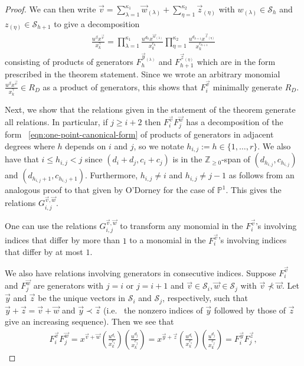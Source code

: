 \documentclass{amsart}
\theoremstyle{plain}
\theoremstyle{definition}
\theoremstyle{remark}
\numberwithin{equation}{section}
\newcommand\bp{{\mathbb P}}
\newcommand\bz{{\mathbb Z}}
\newcommand\mss{\mathscr{S}}
\begin{document}
\begin{proof}
\noindent
We can then write $\vec{v}  = \sum_{\lambda=1}^{\kappa_1}\vec{w}_{(\lambda)} +
\sum_{\eta=1}^{\kappa_2} \vec z_{(\eta)}$ with $w_{(\lambda)} \in \mss_h$ and
$z_{(\eta)} \in \mss_{h+1}$ to give a decomposition
\begin{align}
\label{eqn:one-point-canonical-form}
	\frac{u^{\beta} x^{\vec{v}}} {x_k^{\gamma}}	= \prod_{\lambda = 1}
	^{\kappa_1} \frac{u^{d_h} x^{\vec{w}_{(\lambda)}}} {x_k^{c_h}}
	\prod_{\eta = 1}^{\kappa_2} \frac{u^{d_{h + 1}} x^{\vec{z}_{(\eta)}}}
	{x_k^{c_{h + 1}}}
\end{align}
\noindent
consisting of products of generators $F_h^{\vec{y}_{(\lambda)}}$
and $F_{h + 1}^{\vec{z}_{(\eta)}}$ which are in the form
prescribed in the theorem statement. Since we wrote an arbitrary monomial
$\frac{u^{\beta} x^{\vec{v}}}{x_k^\gamma} \in R_D$ as a product of generators,
this shows that $F_i^{\vec v}$ minimally generate $R_D$.

Next, we show that the relations given in the statement of the theorem generate all relations. 
In particular, if $j \geq i + 2$ then $F_i^{\vec{v}} F_j^{\vec{w}}$
has a decomposition of the form ~\eqref{eqn:one-point-canonical-form} of 
products of generators in adjacent degrees where $h$
depends on $i$ and $ j$, so we notate $h_{i, j} := h \in \{1, \ldots, r\}$. We 
also have that $i \leq h_{i, j} < j$ since $(d_i + d_j, c_i + c_j)$ is in the
$\bz_{\geq 0}$-span of $(d_{h_{i, j}}, c_{h_{i, j}})$ and
$(d_{h_{i, j} + 1}, c_{h_{i, j} + 1})$. Furthermore,
$h_{i, j} \neq i$ and $h_{i, j} \neq j - 1$
as follows from an analogous proof to that given by O'Dorney
\cite[Theorem 6]{dorney:canonical} for the case of
$\bp^1$. This gives the relations
$G_{i, j}^{\vec{v}, \vec{w}}$.

One can use the relations $G_{i, j}^{\vec{v}, \vec{w}}$
to transform any monomial in the $F_i^{\vec{v}}$'s involving
indices that differ by more than $1$ to a monomial in the $F_i
^{\vec{v}}$'s involving indices that differ by at most $1$.

We also have relations involving generators in consecutive
indices. Suppose $F_i^{\vec{v}}$ and $F_j^{\vec{w}}$ are
generators with $j = i$ or $j = i + 1$ and $\vec{v} \in
\mss_i, \vec{w} \in \mss_j$ with $\vec{v} \not\prec \vec{w}$.
Let $\vec{y}$ and $\vec{z}$ be the unique vectors in $\mss_i$ and
$\mss_j$, respectively, such that $\vec{y} + \vec{z} = \vec{v} +
\vec{w}$ and $\vec{y} \prec \vec{z}$ (i.e.~ the nonzero indices
of $\vec{y}$ followed by those of $\vec{z}$ give an increasing
sequence). Then we see that
\begin{align*}
	F_i^{\vec{v}} F_j^{\vec{w}} = x^{\vec{v} + \vec{w}}
	\left(\frac{u^{d_i}}{x_k^{c_i}}\right)
	\left(\frac{u^{d_j}}{x_k^{c_j}}\right)
	= x^{\vec{y} + \vec{z}}
	\left(\frac{u^{d_i}}{x_k^{c_i}}\right)
	\left(\frac{u^{d_j}}{x_k^{c_j}}\right)
	= F_i^{\vec{y}} F_j^{\vec{z}},
\end{align*}


\end{proof}
\end{document}
